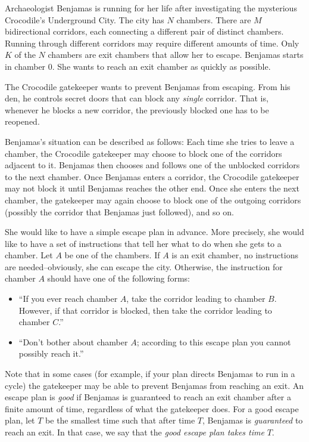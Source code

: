 Archaeologist Benjamas is running for her life after investigating the mysterious Crocodile's Underground City. The city has $N$ chambers. There are $M$ bidirectional corridors, each connecting a different pair of distinct chambers. Running through different corridors may require different amounts of time. Only $K$ of the $N$ chambers are exit chambers that allow her to escape. Benjamas starts in chamber $0$. She wants to reach an exit chamber as quickly as possible.

The Crocodile gatekeeper wants to prevent Benjamas from escaping. From his den, he controls secret doors that can block any \textit{single} corridor. That is, whenever he blocks a new corridor, the previously blocked one has to be reopened.

Benjamas's situation can be described as follows: Each time she tries to leave a chamber, the Crocodile gatekeeper may choose to block one of the corridors adjacent to it. Benjamas then chooses and follows one of the unblocked corridors to the next chamber. Once Benjamas enters a corridor, the Crocodile gatekeeper may not block it until Benjamas reaches the other end. Once she enters the next chamber, the gatekeeper may again choose to block one of the outgoing corridors (possibly the corridor that Benjamas just followed), and so on.

She would like to have a simple escape plan in advance. More precisely, she would like to have a set of instructions that tell her what to do when she gets to a chamber. Let $A$ be one of the chambers. If $A$ is an exit chamber, no instructions are needed--obviously, she can escape the city. Otherwise, the instruction for chamber $A$ should have one of the following forms:
\begin{itemize}
\item ``If you ever reach chamber $A$, take the corridor leading to chamber $B$. However, if that
corridor is blocked, then take the corridor leading to chamber $C$.''
\item ``Don't bother about chamber $A$; according to this escape plan you cannot possibly reach
it.''
\end{itemize}
Note that in some cases (for example, if your plan directs Benjamas to run in a cycle) the gatekeeper may be able to prevent Benjamas from reaching an exit. An escape plan is \textit{good} if Benjamas is guaranteed to reach an exit chamber after a finite amount of time, regardless of what the
gatekeeper does. For a good escape plan, let $T$ be the smallest time such that after time $T$, Benjamas is \textit{guaranteed} to reach an exit. In that case, we say that the \textit{good escape plan takes time} $T$.


